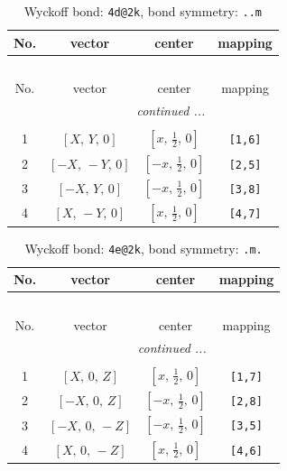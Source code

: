 \documentclass[fleqn,8pt]{jsarticle}
\begin{document}
\begin{longtable}{cccc}
\caption{Wyckoff bond: {\tt 4d@2k}, bond symmetry: {\tt ..m}}
 \\
 \hline \hline
No. & vector & center & mapping \\ \hline \endfirsthead

\multicolumn{3}{l}{\tablename\ \thetable{}} \\
 \hline \hline
No. & vector & center & mapping \\ \hline \endhead

 \hline \hline
\multicolumn{3}{r}{\footnotesize\it continued ...} \\ \endfoot

 \hline \hline
\multicolumn{3}{r}{} \\ \endlastfoot

1 & $\left[ X,\, Y,\, 0 \right]$ & $\left[ x,\, \frac{1}{2},\, 0 \right]$ & {\tt [1,6]} \\ \hline
2 & $\left[ - X,\, - Y,\, 0 \right]$ & $\left[ - x,\, \frac{1}{2},\, 0 \right]$ & {\tt [2,5]} \\ \hline
3 & $\left[ - X,\, Y,\, 0 \right]$ & $\left[ - x,\, \frac{1}{2},\, 0 \right]$ & {\tt [3,8]} \\ \hline
4 & $\left[ X,\, - Y,\, 0 \right]$ & $\left[ x,\, \frac{1}{2},\, 0 \right]$ & {\tt [4,7]} \\
\end{longtable}
\renewcommand{\arraystretch}{1.2}
\begin{longtable}{cccc}
\caption{Wyckoff bond: {\tt 4e@2k}, bond symmetry: {\tt .m.}}
 \\
 \hline \hline
No. & vector & center & mapping \\ \hline \endfirsthead

\multicolumn{3}{l}{\tablename\ \thetable{}} \\
 \hline \hline
No. & vector & center & mapping \\ \hline \endhead

 \hline \hline
\multicolumn{3}{r}{\footnotesize\it continued ...} \\ \endfoot

 \hline \hline
\multicolumn{3}{r}{} \\ \endlastfoot

1 & $\left[ X,\, 0,\, Z \right]$ & $\left[ x,\, \frac{1}{2},\, 0 \right]$ & {\tt [1,7]} \\ \hline
2 & $\left[ - X,\, 0,\, Z \right]$ & $\left[ - x,\, \frac{1}{2},\, 0 \right]$ & {\tt [2,8]} \\ \hline
3 & $\left[ - X,\, 0,\, - Z \right]$ & $\left[ - x,\, \frac{1}{2},\, 0 \right]$ & {\tt [3,5]} \\ \hline
4 & $\left[ X,\, 0,\, - Z \right]$ & $\left[ x,\, \frac{1}{2},\, 0 \right]$ & {\tt [4,6]} \\
\end{longtable}
\end{document}
